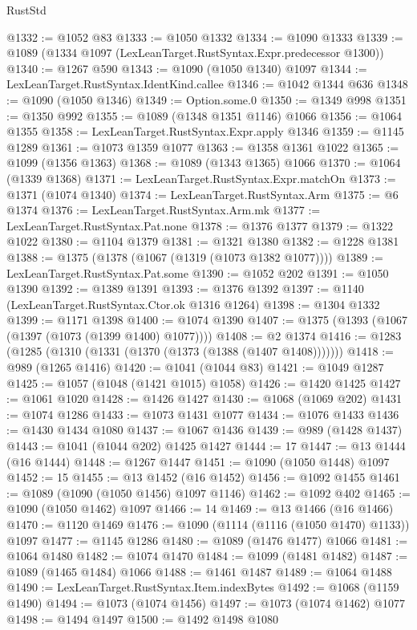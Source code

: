 \begin{lexlean}{RustStd}
\begin{coremodule}
@1332 := @1052 @83
@1333 := @1050 @1332
@1334 := @1090 @1333
@1339 := @1089 (@1334 @1097 (LexLeanTarget.RustSyntax.Expr.predecessor @1300))
@1340 := @1267 @590
@1343 := @1090 (@1050 @1340) @1097
@1344 := LexLeanTarget.RustSyntax.IdentKind.callee
@1346 := @1042 @1344 @636
@1348 := @1090 (@1050 @1346)
@1349 := Option.some.{0}
@1350 := @1349 @998
@1351 := @1350 @992
@1355 := @1089 (@1348 @1351 @1146) @1066
@1356 := @1064 @1355
@1358 := LexLeanTarget.RustSyntax.Expr.apply @1346
@1359 := @1145 @1289
@1361 := @1073 @1359 @1077
@1363 := @1358 @1361 @1022
@1365 := @1099 (@1356 @1363)
@1368 := @1089 (@1343 @1365) @1066
@1370 := @1064 (@1339 @1368)
@1371 := LexLeanTarget.RustSyntax.Expr.matchOn
@1373 := @1371 (@1074 @1340)
@1374 := LexLeanTarget.RustSyntax.Arm
@1375 := @6 @1374
@1376 := LexLeanTarget.RustSyntax.Arm.mk
@1377 := LexLeanTarget.RustSyntax.Pat.none
@1378 := @1376 @1377
@1379 := @1322 @1022
@1380 := @1104 @1379
@1381 := @1321 @1380
@1382 := @1228 @1381
@1388 := @1375 (@1378 (@1067 (@1319 (@1073 @1382 @1077))))
@1389 := LexLeanTarget.RustSyntax.Pat.some
@1390 := @1052 @202
@1391 := @1050 @1390
@1392 := @1389 @1391
@1393 := @1376 @1392
@1397 := @1140 (LexLeanTarget.RustSyntax.Ctor.ok @1316 @1264)
@1398 := @1304 @1332
@1399 := @1171 @1398
@1400 := @1074 @1390
@1407 := @1375 (@1393 (@1067 (@1397 (@1073 (@1399 @1400) @1077))))
@1408 := @2 @1374
@1416 := @1283 (@1285 (@1310 (@1331 (@1370 (@1373 (@1388 (@1407 @1408)))))))
@1418 := @989 (@1265 @1416)
@1420 := @1041 (@1044 @83)
@1421 := @1049 @1287
@1425 := @1057 (@1048 (@1421 @1015) @1058)
@1426 := @1420 @1425
@1427 := @1061 @1020
@1428 := @1426 @1427
@1430 := @1068 (@1069 @202)
@1431 := @1074 @1286
@1433 := @1073 @1431 @1077
@1434 := @1076 @1433
@1436 := @1430 @1434 @1080
@1437 := @1067 @1436
@1439 := @989 (@1428 @1437)
@1443 := @1041 (@1044 @202) @1425 @1427
@1444 := 17
@1447 := @13 @1444 (@16 @1444)
@1448 := @1267 @1447
@1451 := @1090 (@1050 @1448) @1097
@1452 := 15
@1455 := @13 @1452 (@16 @1452)
@1456 := @1092 @1455
@1461 := @1089 (@1090 (@1050 @1456) @1097 @1146)
@1462 := @1092 @402
@1465 := @1090 (@1050 @1462) @1097
@1466 := 14
@1469 := @13 @1466 (@16 @1466)
@1470 := @1120 @1469
@1476 := @1090 (@1114 (@1116 (@1050 @1470) @1133)) @1097
@1477 := @1145 @1286
@1480 := @1089 (@1476 @1477) @1066
@1481 := @1064 @1480
@1482 := @1074 @1470
@1484 := @1099 (@1481 @1482)
@1487 := @1089 (@1465 @1484) @1066
@1488 := @1461 @1487
@1489 := @1064 @1488
@1490 := LexLeanTarget.RustSyntax.Item.indexBytes
@1492 := @1068 (@1159 @1490)
@1494 := @1073 (@1074 @1456)
@1497 := @1073 (@1074 @1462) @1077
@1498 := @1494 @1497
@1500 := @1492 @1498 @1080

\end{coremodule}
\end{lexlean}
